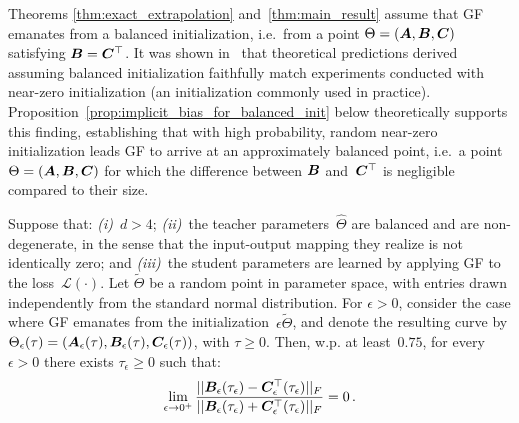 Theorems \ref{thm:exact_extrapolation} and~\ref{thm:main_result} assume that GF emanates from a balanced initialization, i.e.~from a point $\Theta = ( {\bm{A}} , {\bm{B}} , {\bm{C}} )$ satisfying ${\bm{B}} = {\bm{C}}^\top$.
It was shown in~\cite{cohen2022extrapolation} that theoretical predictions derived assuming balanced initialization faithfully match experiments conducted with near-zero initialization (an initialization commonly used in practice).
Proposition~\ref{prop:implicit_bias_for_balanced_init} below theoretically supports this finding, establishing that with high probability, random near-zero initialization leads GF to arrive at an approximately balanced point, i.e.~a point $\Theta = ( {\bm{A}} , {\bm{B}} , {\bm{C}} )$ for which the difference between ${\bm{B}}$ and~${\bm{C}}^\top$ is negligible compared to their size.
\begin{proposition}\label{prop:implicit_bias_for_balanced_init}
Suppose that:
\emph{(i)}~$d > 4$;
\emph{(ii)}~the teacher parameters~$\hat{\Theta}$ are balanced and are non-degenerate, in the sense that the input-output mapping they realize is not identically zero;
and 
\emph{(iii)}~the student parameters are learned by applying GF to the loss~$\mathcal{L} ( \cdot )$.
Let $\tilde{\Theta}$ be a random point in parameter space, with entries drawn independently from the standard normal distribution.
For $\epsilon > 0$, consider the case where GF emanates from the initialization~$\epsilon \tilde{\Theta}$, and denote the resulting curve by $\Theta_\epsilon ( \tau ) = ( {\bm{A}}_\epsilon ( \tau ) , {\bm{B}}_\epsilon ( \tau ) , {\bm{C}}_\epsilon ( \tau ) )$, with $\tau \geq 0$.
Then, w.p. at least~$0.75$, for every $\epsilon > 0$ there exists $\tau_\epsilon \geq 0$ such that:
\begin{equation}
    \lim_{\epsilon\rightarrow 0^+}\frac{||{\bm{B}}_{\epsilon}(\tau_\epsilon) - {\bm{C}}_{\epsilon}^\top(\tau_\epsilon) ||_F}{||{\bm{B}}_{\epsilon}(\tau_\epsilon) + {\bm{C}}_{\epsilon}^\top(\tau_\epsilon) ||_F}=0
    \text{\,.}
\end{equation}
\end{proposition}

